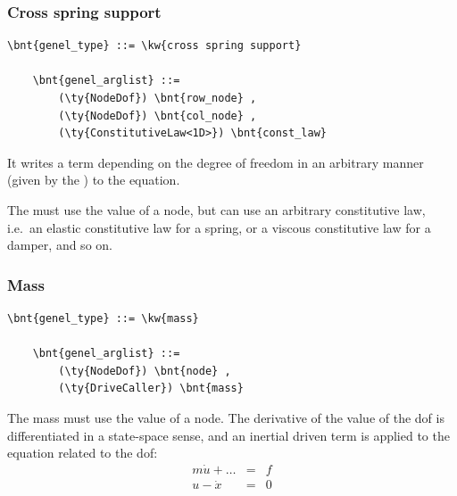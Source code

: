 \subsubsection{Cross spring support}
\label{sec:EL:GENEL:CROSS-SPRING-SUPPORT}
\begin{Verbatim}[commandchars=\\\{\}]
    \bnt{genel_type} ::= \kw{cross spring support}

    \bnt{genel_arglist} ::=
        (\ty{NodeDof}) \bnt{row_node} ,
        (\ty{NodeDof}) \bnt{col_node} ,
        (\ty{ConstitutiveLaw<1D>}) \bnt{const_law}
\end{Verbatim}
It writes a term depending on the  degree of freedom in an
arbitrary manner (given by the ) to the 
 equation.

The  must use the  value
of a  node, but can use an arbitrary constitutive law,
i.e.\ an elastic constitutive law for a spring, or a viscous
constitutive law for a damper, and so on.

\subsubsection{Mass}
\label{sec:EL:GENEL:MASS}
\begin{Verbatim}[commandchars=\\\{\}]
    \bnt{genel_type} ::= \kw{mass}

    \bnt{genel_arglist} ::=
        (\ty{NodeDof}) \bnt{node} ,
        (\ty{DriveCaller}) \bnt{mass}
\end{Verbatim}
The mass must use the  value of a  node.
The derivative of the  value of
the dof is differentiated in a state-space sense, and an inertial driven
term is applied to the equation related to the dof:
\begin{eqnarray*}
        m\dot{u} + \ldots & = & f \\
	u - \dot{x} & = & 0
\end{eqnarray*}

